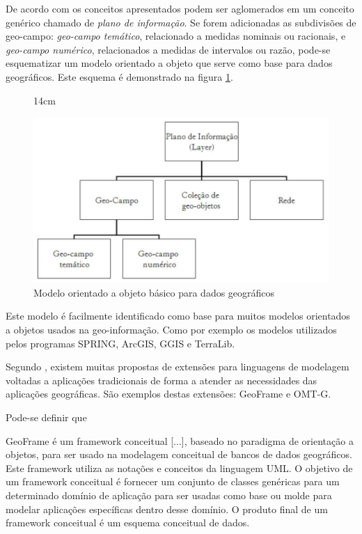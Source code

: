 De acordo com  os conceitos apresentados podem ser aglomerados em um conceito genérico chamado de \textit{plano de informação}. Se forem adicionadas as subdivisões de geo-campo: \textit{geo-campo temático}, relacionado a medidas nominais ou racionais, e \textit{geo-campo numérico}, relacionados a medidas de intervalos ou razão, pode-se esquematizar um modelo orientado a objeto que serve como base para dados geográficos. Este esquema é demonstrado na figura \ref{oo_dados_geo}.

\begin{figure}[!ht]{14cm}
  \caption{Modelo orientado a objeto básico para dados geográficos} \label{oo_dados_geo}
  \includegraphics[width=0.75\hsize]{figuras/oo_dados_geo.png}
\end{figure}

Este modelo é facilmente identificado como base para muitos modelos orientados a objetos usados na geo-informação. Como por exemplo os modelos utilizados pelos programas SPRING, ArcGIS, GGIS e TerraLib. 

Segundo , existem muitas propostas de extensões para linguagens de modelagem voltadas a aplicações tradicionais de forma a atender as necessidades das aplicações geográficas. São exemplos destas extensões: GeoFrame e OMT-G.

Pode-se definir que
\begin{citacao}
    GeoFrame é um framework conceitual [...], baseado no paradigma de orientação a objetos, para ser usado na modelagem conceitual de bancos de dados geográficos. Este framework utiliza as notações e conceitos da linguagem UML. O objetivo de um framework conceitual é fornecer um conjunto de classes genéricas para um determinado domínio de aplicação para ser usadas como base ou molde para modelar aplicações específicas dentro desse domínio. O produto final de um framework conceitual é um esquema conceitual de dados. \cite[p.43]{queiroz2006tutorial}
\end{citacao}

